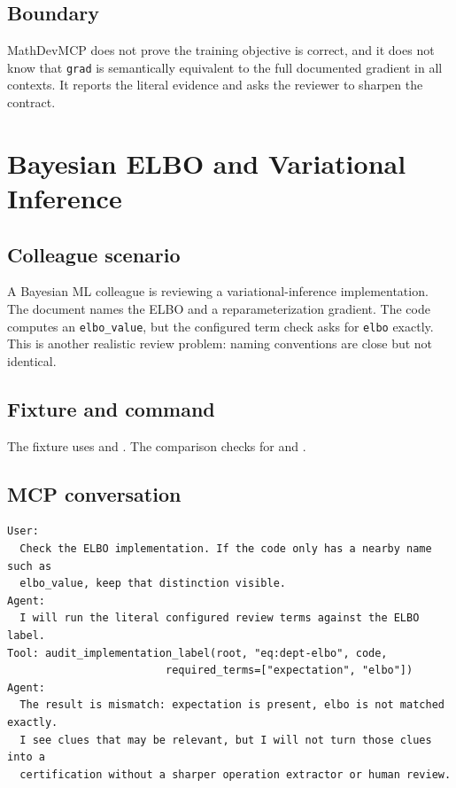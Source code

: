 \documentclass[12pt,a4paper,openany]{book}
\begin{document}
\section*{Boundary}

MathDevMCP does not prove the training objective is correct, and it does not
know that \texttt{grad} is semantically equivalent to the full documented
gradient in all contexts. It reports the literal evidence and asks the reviewer
to sharpen the contract.

\chapter{Bayesian ELBO and Variational Inference}

\section*{Colleague scenario}

A Bayesian ML colleague is reviewing a variational-inference implementation. The
document names the ELBO and a reparameterization gradient. The code computes an
\texttt{elbo\_value}, but the configured term check asks for \texttt{elbo}
exactly. This is
another realistic review problem: naming conventions are close but not
identical.

\section*{Fixture and command}

The fixture uses  and
. The comparison checks
 for  and .

\section*{MCP conversation}

\begin{lstlisting}[basicstyle=\ttfamily\scriptsize]
User:
  Check the ELBO implementation. If the code only has a nearby name such as
  elbo_value, keep that distinction visible.
Agent:
  I will run the literal configured review terms against the ELBO label.
Tool: audit_implementation_label(root, "eq:dept-elbo", code,
                         required_terms=["expectation", "elbo"])
Agent:
  The result is mismatch: expectation is present, elbo is not matched exactly.
  I see clues that may be relevant, but I will not turn those clues into a
  certification without a sharper operation extractor or human review.
\end{lstlisting}
\end{document}
